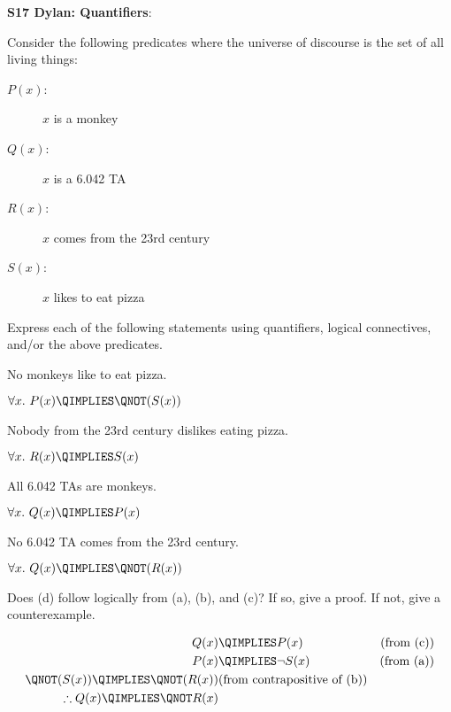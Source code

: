 \begin{problem} 
\begin{staffnotes}
\textbf{S17 Dylan: Quantifiers}:
\end{staffnotes}

Consider the following predicates where the universe of discourse is
the set of all living things:
\begin{description}
\item[$P(x)$:] $x$ is a monkey
\item[$Q(x)$:] $x$ is a 6.042 TA
\item[$R(x)$:] $x$ comes from the 23rd century
\item[$S(x)$:] $x$ likes to eat pizza
\end{description}
Express each of the following statements using quantifiers, logical
connectives, and/or the above predicates.

\begin{problemparts}
\ppart No monkeys like to eat pizza.

\begin{solution}
$\forall x.\ P(x) \QIMPLIES \QNOT(S(x))$
\end{solution}

\ppart Nobody from the 23rd century dislikes eating pizza.

\begin{solution}
$\forall x.\ R(x) \QIMPLIES S(x)$
\end{solution}

\ppart All 6.042 TAs are monkeys.

\begin{solution}
$\forall x.\ Q(x) \QIMPLIES P(x)$
\end{solution}

\ppart  No 6.042 TA comes from the 23rd century.

\begin{solution}
$\forall x.\ Q(x) \QIMPLIES \QNOT(R(x))$
\end{solution}

\ppart Does (d) follow logically from (a), (b), and (c)?  If so, give
a proof.  If not, give a counterexample.

\begin{solution}
\begin{center}
\begin{align*}
Q(x) & \QIMPLIES P(x) & \text{(from (c))} \\
P(x) & \QIMPLIES \neg S(x) & \text{(from (a))} \\
\QNOT(S(x)) \QIMPLIES \QNOT(R(x)) & \text{(from contrapositive of (b))}\\ 
\therefore Q(x) \QIMPLIES \QNOT R(x)
\end{align*}
\end{center}
\end{solution}


\end{problemparts}
\end{problem}
